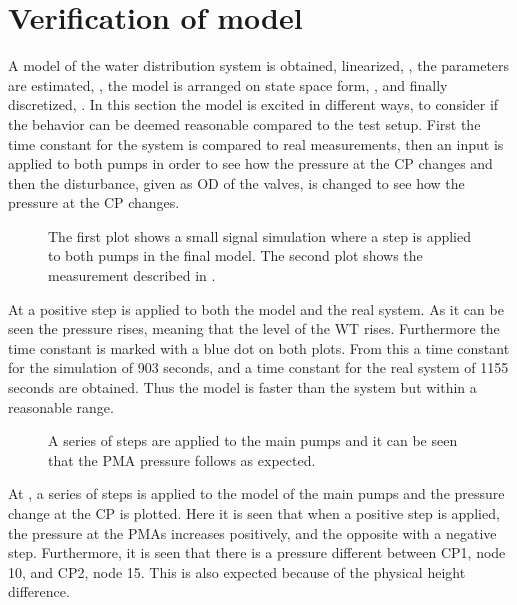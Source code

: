 \section{Verification of model}
\label{verification_of_model}

A model of the water distribution system is obtained, linearized, , the parameters are estimated, , the model is arranged on state space form, , and finally discretized, . In this section the model is excited in different ways, to consider if the behavior can be deemed reasonable compared to the test setup. First the time constant for the system is compared to real measurements, then an input is applied to both pumps in order to see how the pressure at the CP changes and then the disturbance, given as OD of the valves, is changed to see how the pressure at the CP changes. 

\begin{figure}[H]
   \centering
    
    \caption{The first plot shows a small signal simulation where a step is applied to both pumps in the final model. The second plot shows the measurement described in .}
    \label{simulation_time_constant}
\end{figure}

At  a positive step is applied to both the model and the real system. As it can be seen the pressure rises, meaning that the level of the WT rises. Furthermore the time constant is marked with a blue dot on both plots. From this a time constant for the simulation of 903 seconds, and a time constant for the real system of 1155 seconds are obtained. Thus the model is faster than the system but within a reasonable range.

\begin{figure}[H]
   \centering
    
    \caption{A series of steps are applied to the main pumps and it can be seen that the PMA pressure follows as expected.}
    \label{input_simulation}
\end{figure}

At , a series of steps is applied to the model of the main pumps and the pressure change at the CP is plotted. Here it is seen that when a positive step is applied, the pressure at the PMAs increases positively, and the opposite with a negative step. Furthermore, it is seen that there is a pressure different between CP1, node 10, and CP2, node 15. This is also expected because of the physical height difference.  


